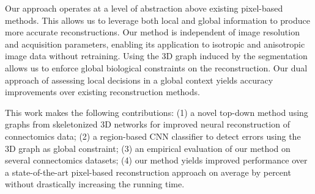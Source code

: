 Our approach operates at a level of abstraction above existing pixel-based methods. This allows us to leverage both local and global information to produce more accurate reconstructions. Our method is independent of image resolution and acquisition parameters, enabling its application to isotropic and anisotropic image data without retraining. Using the 3D graph induced by the segmentation allows us to enforce global biological constraints on the reconstruction. Our dual approach of assessing local decisions in a global context yields accuracy improvements over existing reconstruction methods.

This work makes the following contributions: (1) a novel top-down method using  graphs from skeletonized 3D networks for improved neural reconstruction of connectomics data; (2) a region-based CNN classifier to detect errors using the 3D graph as global constraint; (3) an empirical evaluation of our method on several connectomics datasets; (4) our method yields improved performance over a state-of-the-art pixel-based reconstruction approach on average by  percent without drastically increasing the running time.
